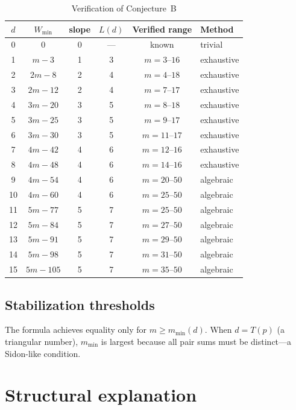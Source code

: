 \documentclass[11pt,a4paper]{amsart}
\theoremstyle{definition}
\theoremstyle{remark}
\begin{document}
\begin{table}[ht]
\centering
\caption{Verification of Conjecture~B}\label{tab:conjB}
\begin{tabular}{@{}cccccl@{}}
\toprule
$d$ & $W_{\min}$ & slope & $L(d)$ & Verified range & Method \\
\midrule
0 & $0$ & 0 & --- & known & trivial \\
1 & $m{-}3$ & 1 & 3 & $m=3\text{--}16$ & exhaustive \\
2 & $2m{-}8$ & 2 & 4 & $m=4\text{--}18$ & exhaustive \\
3 & $2m{-}12$ & 2 & 4 & $m=7\text{--}17$ & exhaustive \\
4 & $3m{-}20$ & 3 & 5 & $m=8\text{--}18$ & exhaustive \\
5 & $3m{-}25$ & 3 & 5 & $m=9\text{--}17$ & exhaustive \\
6 & $3m{-}30$ & 3 & 5 & $m=11\text{--}17$ & exhaustive \\
7 & $4m{-}42$ & 4 & 6 & $m=12\text{--}16$ & exhaustive \\
8 & $4m{-}48$ & 4 & 6 & $m=14\text{--}16$ & exhaustive \\
9 & $4m{-}54$ & 4 & 6 & $m=20\text{--}50$ & algebraic \\
10 & $4m{-}60$ & 4 & 6 & $m=25\text{--}50$ & algebraic \\
11 & $5m{-}77$ & 5 & 7 & $m=25\text{--}50$ & algebraic \\
12 & $5m{-}84$ & 5 & 7 & $m=27\text{--}50$ & algebraic \\
13 & $5m{-}91$ & 5 & 7 & $m=29\text{--}50$ & algebraic \\
14 & $5m{-}98$ & 5 & 7 & $m=31\text{--}50$ & algebraic \\
15 & $5m{-}105$ & 5 & 7 & $m=35\text{--}50$ & algebraic \\
\bottomrule
\end{tabular}
\end{table}

\subsection{Stabilization thresholds}

The formula achieves equality only for $m \ge m_{\min}(d)$.
When $d = T(p)$ (a triangular number), $m_{\min}$ is largest because
all pair sums must be distinct---a Sidon-like condition.

\section{Structural explanation}\label{sec:structure}
\end{document}
